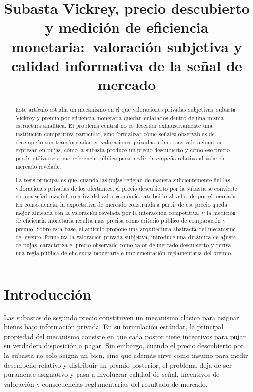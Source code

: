 \documentclass[11pt,a4paper]{article}
\title{Subasta Vickrey, precio descubierto y medición de eficiencia monetaria:\
valoración subjetiva y calidad informativa de la señal de mercado}
\author{}
\date{}
\theoremstyle{definition}
\begin{document}
\maketitle

\begin{abstract}
Este artículo estudia un mecanismo en el que valoraciones privadas subjetivas, subasta Vickrey y premio por eficiencia monetaria quedan enlazados dentro de una misma estructura analítica. El problema central no es describir exhaustivamente una institución competitiva particular, sino formalizar cómo señales observables del desempeño son transformadas en valoraciones privadas, cómo esas valoraciones se expresan en pujas, cómo la subasta produce un precio descubierto y cómo ese precio puede utilizarse como referencia pública para medir desempeño relativo al valor de mercado revelado.

La tesis principal es que, cuando las pujas reflejan de manera suficientemente fiel las valoraciones privadas de los ofertantes, el precio descubierto por la subasta se convierte en una señal más informativa del valor económico atribuido al vehículo por el mercado. En consecuencia, la expectativa de mercado construida a partir de ese precio queda mejor alineada con la valoración revelada por la interacción competitiva, y la medición de eficiencia monetaria resulta más precisa como criterio público de comparación y premio. Sobre esta base, el artículo propone una arquitectura abstracta del mecanismo del evento, formaliza la valoración privada subjetiva, introduce una dinámica de ajuste de pujas, caracteriza el precio observado como valor de mercado descubierto y deriva una regla pública de eficiencia monetaria e implementación reglamentaria del premio.
\end{abstract}

\section{Introducción}

Las subastas de segundo precio constituyen un mecanismo clásico para asignar bienes bajo información privada. En su formulación estándar, la principal propiedad del mecanismo consiste en que cada postor tiene incentivos para pujar su verdadera disposición a pagar. Sin embargo, cuando el precio descubierto por la subasta no solo asigna un bien, sino que además sirve como insumo para medir desempeño relativo y distribuir un premio posterior, el problema deja de ser puramente asignativo y pasa a involucrar calidad de señal, incentivos de valoración y consecuencias reglamentarias del resultado de mercado.
\end{document}
